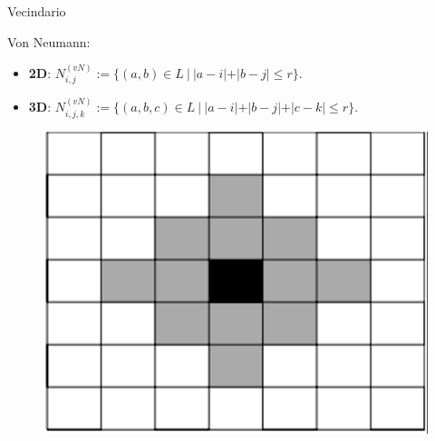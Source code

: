 \begin{frame}{Vecindario}
    \begin{block}{Von Neumann:}
        \begin{minipage}[t]{0.8\linewidth}
            \begin{itemize}
                \item \textbf{2D}: $N_{i,j}^{(vN)}:=\{(a,b) \in L\ |\ |a - i| + |b - j| \leq r\}$.
                \item \textbf{3D}: $N_{i,j, k}^{(vN)}:=\{(a,b,c) \in L\ |\ |a-i| + |b - j| + |c - k| \leq r\}$.
            \end{itemize}
        \end{minipage}%
        \hfill%
        \begin{minipage}[t]{0.2\linewidth}
            \begin{figure}[H]
                \centering
                \includegraphics[width=0.7\linewidth]{pic/01-intro/vn}
            \end{figure}
        \end{minipage}


\end{block}
\end{frame}
